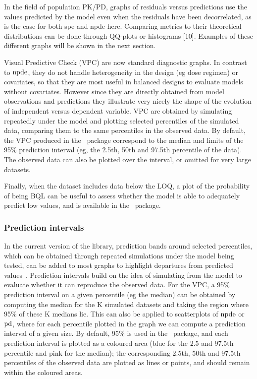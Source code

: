 In the field of population PK/PD, graphs of residuals versus predictions use the values predicted by the model even when the residuals have been decorrelated, as is the case for both spe and npde here. Comparing metrics to their theoretical distributions can be done through QQ-plots or histograms [10]. Examples of these different graphs will be shown in the next section.

Visual Predictive Check (VPC) are now standard diagnostic graphs. In contrast to ${\rm npde}$, they do not handle heterogeneity in the design (eg dose regimen) or covariates, so that they are most useful in balanced designs to evaluate models without covariates. However since they are directly obtained from model observations and predictions they illustrate very nicely the shape of the evolution of independent versus dependent variable. VPC are obtained by simulating repeatedly under the model and plotting selected percentiles of the simulated data, comparing them to the same percentiles in the observed data. By default, the VPC produced in the \npde~package correspond to the median and limits of the 95\% prediction interval (eg, the 2.5th, 50th and 97.5th percentile of the data). The observed data can also be plotted over the interval, or omitted for very large datasets.

Finally, when the dataset includes data below the LOQ, a plot of the probability of being BQL can be useful to assess whether the model is able to adequately predict low values, and is available in the \npde~package.

\subsubsection{Prediction intervals} 

\hskip 18pt In the current version of the library, prediction bands around selected percentiles, which can be obtained through repeated simulations under the model being tested, can be added to most graphs to highlight departures from predicted values~\cite{Comets10}. Prediction intervals build on the idea of simulating from the model to evaluate whether it can reproduce the observed data. For the VPC, a 95\% prediction interval on a given percentile (eg the median) can be obtained by computing the median for the K simulated datasets and taking the region where 95\% of these K medians lie. This can also be applied to scatterplots of ${\rm npde}$ or ${\rm pd}$, where for each percentile plotted in the graph we can compute a prediction interval of a given size. By default, 95\% is used in the \npde~package, and each prediction interval is plotted as a coloured area (blue for the 2.5 and 97.5th percentile and pink for the median); the corresponding 2.5th, 50th and 97.5th percentiles of the observed data are plotted as 
lines or points, and should remain within the coloured areas.

